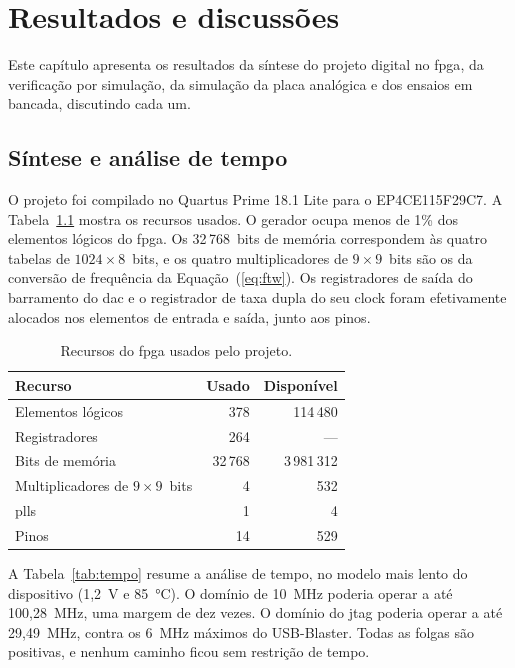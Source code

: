 \chapter{Resultados e discussões}\label{cap:resultados}

Este capítulo apresenta os resultados da síntese do projeto digital no \ac{fpga}, da verificação por simulação, da simulação da placa analógica e dos ensaios em bancada, discutindo cada um.

\section{Síntese e análise de tempo}

O projeto foi compilado no Quartus Prime 18.1 Lite para o EP4CE115F29C7. A Tabela~\ref{tab:recursos} mostra os recursos usados. O gerador ocupa menos de 1\% dos elementos lógicos do \ac{fpga}. Os 32\,768~bits de memória correspondem às quatro tabelas de \(1024 \times 8\)~bits, e os quatro multiplicadores de \(9 \times 9\)~bits são os da conversão de frequência da Equação~(\ref{eq:ftw}). Os registradores de saída do barramento do \ac{dac} e o registrador de taxa dupla do seu clock foram efetivamente alocados nos elementos de entrada e saída, junto aos pinos.

\begin{table}
	\caption{Recursos do \acs{fpga} usados pelo projeto.}
	\label{tab:recursos}
	\begin{tabular}{l r r}\toprule
		Recurso & Usado & Disponível\\\midrule
		Elementos lógicos & 378 & 114\,480\\
		Registradores & 264 & ---\\
		Bits de memória & 32\,768 & 3\,981\,312\\
		Multiplicadores de \(9 \times 9\)~bits & 4 & 532\\
		\acp{pll} & 1 & 4\\
		Pinos & 14 & 529\\\bottomrule
	\end{tabular}
\end{table}

A Tabela~\ref{tab:tempo} resume a análise de tempo, no modelo mais lento do dispositivo (1,2~V e 85~°C). O domínio de 10~MHz poderia operar a até 100,28~MHz, uma margem de dez vezes. O domínio do \ac{jtag} poderia operar a até 29,49~MHz, contra os 6~MHz máximos do USB-Blaster. Todas as folgas são positivas, e nenhum caminho ficou sem restrição de tempo.

